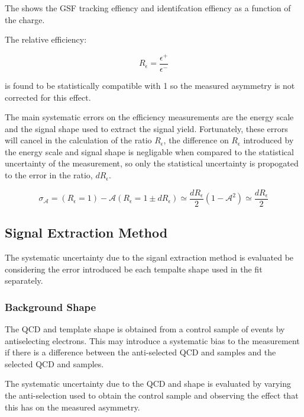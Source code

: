 The  shows the GSF tracking effiency and identifcation 
effiency as a function of the charge.

The relative efficiency: 

\begin{equation}
R_\epsilon  =  \frac{\epsilon^+}{\epsilon^-}
\end{equation}

is found to be statistically compatible with 1 so the measured asymmetry is not
corrected for this effect.

The main systematic errors on the efficiency measurements are the energy scale
and the signal shape used to extract the signal yield. Fortunately, these
errors will cancel in the calculation of the ratio $R_\epsilon$, the difference
on  $R_\epsilon$ introduced by the energy scale and signal shape is negligable
when compared to the statistical uncertainty of the measurement, so only the
statistical uncertainty is propogated to the error in the ratio,
$dR_\epsilon$.

\begin{equation}
  \label{eq:releff}
  \sigma_{\mathcal{A}} =\mathcal{}(R_\epsilon=1) - \mathcal{A}(R_\epsilon=1\pm dR_\epsilon)  \simeq \frac{dR_\epsilon}{2}(1-\mathcal{A}^2)\simeq \frac{dR_\epsilon}{2}
\end{equation}


\subsection{Signal Extraction Method}

The systematic uncertainty due to the siganl extraction method is evaluated be
considering the error introduced be each \ETm tempalte shape used in the fit
separately.

\subsubsection{Background \ETm Shape}

The \ac{QCD} and \gjet \ETm template shape is obtained from a control sample of
events by antiselecting electrons. This may introduce a systematic bias to the
measurement if there is a difference between the anti-selected \ac{QCD} and \gjet
\ETm samples and the selected \ac{QCD} and \gjet samples.

The systematic uncertainty due to the \ac{QCD} and \gjet \ETm shape is evaluated by
varying the anti-selection used to obtain the control sample and observing the
effect that this has on the measured asymmetry.

